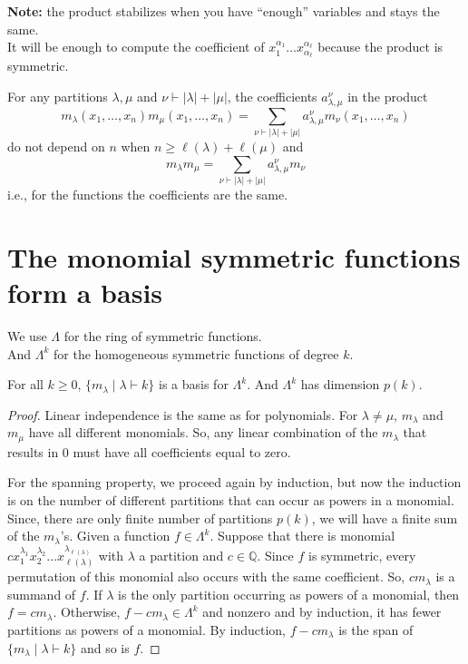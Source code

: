 \documentclass[12pt]{memoir}
\begin{document}
\textbf{Note:} the product stabilizes when you have ``enough'' variables and stays the same.\\
It will be enough to compute the coefficient of $x_1^{\alpha_1} \dots x_{\alpha_\ell}^{\alpha_\ell}$ because the product is symmetric.

\begin{ptcb}
\begin{Prop}
For any partitions $\lambda, \mu$ and $\nu \vdash |\lambda| + |\mu|$, the coefficients $a_{\lambda,\mu}^\nu$ in the product
\[
m_\lambda(x_1, \dots, x_n) m_\mu(x_1, \dots, x_n) = \sum_{\nu \vdash |\lambda| + |\mu|} a_{\lambda,\mu}^\nu m_\nu(x_1, \dots, x_n)
\]
do not depend on $n$ when $n \ge \ell(\lambda) + \ell(\mu)$ and
\[
m_\lambda m_\mu = \sum_{\nu \vdash |\lambda| + |\mu|} a_{\lambda,\mu}^\nu m_\nu
\]
i.e., for the functions the coefficients are the same.
\end{Prop}
\end{ptcb}

\newpage

\section{The monomial symmetric functions form a basis}

We use \textcolor{celesUCR}{$\Lambda$} for the ring of symmetric functions.\\
And \textcolor{celesUCR}{$\Lambda^k$} for the homogeneous symmetric functions of degree $k$.

\begin{ptcb}
\begin{Prop}
For all $k \ge 0$, $\{m_\lambda \mid \lambda \vdash k\}$ is a basis for $\Lambda^k$. And $\Lambda^k$ has dimension $p(k)$.
\end{Prop}
\end{ptcb}

\begin{proof}
Linear independence is the same as for polynomials. For $\lambda \neq \mu$, $m_\lambda$ and $m_\mu$ have all different monomials. So, any linear combination of the $m_\lambda$ that results in $0$ must have all coefficients equal to zero.

For the spanning property, we proceed again by induction, but now the induction is on the number of different partitions that can occur as powers in a monomial. Since, there are only finite number of partitions $p(k)$, we will have a finite sum of the $m_\lambda$'s. Given a function $f \in \Lambda^k$. Suppose that there is monomial $c x_1^{\lambda_1} x_2^{\lambda_2} \dots x_{\ell(\lambda)}^{\lambda_{\ell(\lambda)}}$ with $\lambda$ a partition and $c \in \mathbb{Q}$. Since $f$ is symmetric, every permutation of this monomial also occurs with the same coefficient. So, $c m_\lambda$ is a summand of $f$. If $\lambda$ is the only partition occurring as powers of a monomial, then $f = c m_\lambda$. Otherwise, $f - c m_\lambda \in \Lambda^k$ and nonzero and by induction, it has fewer partitions as powers of a monomial. By induction, $f - c m_\lambda$ is the span of $\{m_\lambda \mid \lambda \vdash k\}$ and so is $f$.
\end{proof}
\end{document}
